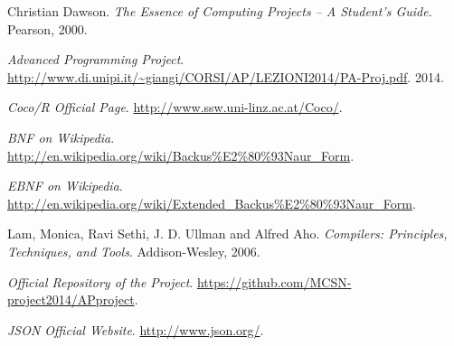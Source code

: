 \cleardoublepage  					%


\begin{thebibliography}{99}
 Christian Dawson. \emph{The Essence of Computing Projects -- A Student's Guide}. Pearson, 2000.

\emph{Advanced Programming Project}. \href{http:\/\/www.di.unipi.it\/\~giangi\/CORSI\/AP\/LEZIONI2014\/PA-Proj.pdf}{\url{http://www.di.unipi.it/~giangi/CORSI/AP/LEZIONI2014/PA-Proj.pdf}}. 2014.

\emph{Coco/R Official Page}. \href{http:\/\/www.ssw.uni-linz.ac.at\/Coco\/}{\url{http://www.ssw.uni-linz.ac.at/Coco/}}.

\emph{BNF on Wikipedia}. \href{http:\/\/en.wikipedia.org\/wiki\/Backus\%E2\%80\%93Naur\_Form}{\url{http://en.wikipedia.org/wiki/Backus\%E2\%80\%93Naur\_Form}}.

\emph{EBNF on Wikipedia}. \href{http:\/ \/en.wikipedia.org\/wiki\/Extended\_Backus\%E2\%80\%93Naur\_Form}{\url{http://en.wikipedia.org/wiki/Extended\_Backus\%E2\%80\%93Naur\_Form}}.

Lam, Monica, Ravi Sethi, J. D. Ullman and Alfred Aho. \emph{Compilers: Principles, Techniques, and Tools}. Addison-Wesley, 2006.

\emph{Official Repository of the Project}. \href{https:\/\/github.com\/MCSN-project2014\/APproject}{\url{https://github.com/MCSN-project2014/APproject}}.

\emph{JSON Official Website}. \href{http:\/\/www.json.org\/}{\url{http://www.json.org/}}.


\end{thebibliography}
